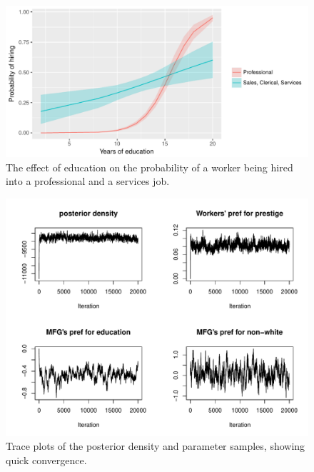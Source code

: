 \begin{figure}[!ht]
  \centering \includegraphics[width=\textwidth,keepaspectratio]{../figure/labor_occ5_educ_effect_on_hiring}
  \caption[The effect of education on the probability of a worker being hired in
  the US labor market.]{The
    effect of education on the probability of a worker being hired into a professional
    and a services job.}
  \label{fig:labor_occ5_educ_effect_on_hiring}
\end{figure}

\begin{figure}[!ht]
  \centering
  \includegraphics[width=\textwidth,keepaspectratio]{../figure/labor_occ5_misc_traceplots}
  \caption[Traceplots showing quick convergence for model of the US labor market.]{Trace plots of the posterior density and
    parameter samples, showing quick convergence.}
  \label{fig:labor_occ5_misc_traceplots}
\end{figure}
